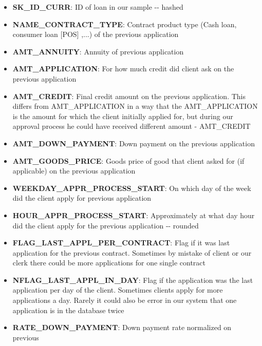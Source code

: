 \documentclass[11pt]{article}
\providecommand{\tightlist}{%
      \setlength{\itemsep}{0pt}\setlength{\parskip}{0pt}}
\begin{document}
\begin{itemize}
\tightlist
\item
  \textbf{SK\_ID\_CURR}: ID of loan in our sample -\/- hashed
\item
  \textbf{NAME\_CONTRACT\_TYPE}: Contract product type (Cash loan,
  consumer loan {[}POS{]} ,...) of the previous application\\
\item
  \textbf{AMT\_ANNUITY}: Annuity of previous application\\
\item
  \textbf{AMT\_APPLICATION}: For how much credit did client ask on the
  previous application\\
\item
  \textbf{AMT\_CREDIT}: Final credit amount on the previous application.
  This differs from AMT\_APPLICATION in a way that the AMT\_APPLICATION
  is the amount for which the client initially applied for, but during
  our approval process he could have received different amount -
  AMT\_CREDIT\\
\item
  \textbf{AMT\_DOWN\_PAYMENT}: Down payment on the previous
  application\\
\item
  \textbf{AMT\_GOODS\_PRICE}: Goods price of good that client asked for
  (if applicable) on the previous application\\
\item
  \textbf{WEEKDAY\_APPR\_PROCESS\_START}: On which day of the week did
  the client apply for previous application\\
\item
  \textbf{HOUR\_APPR\_PROCESS\_START}: Approximately at what day hour
  did the client apply for the previous application -\/- rounded
\item
  \textbf{FLAG\_LAST\_APPL\_PER\_CONTRACT}: Flag if it was last
  application for the previous contract. Sometimes by mistake of client
  or our clerk there could be more applications for one single
  contract\\
\item
  \textbf{NFLAG\_LAST\_APPL\_IN\_DAY}: Flag if the application was the
  last application per day of the client. Sometimes clients apply for
  more applications a day. Rarely it could also be error in our system
  that one application is in the database twice\\
\item
  \textbf{RATE\_DOWN\_PAYMENT}: Down payment rate normalized on previous

\end{itemize}
\end{document}
